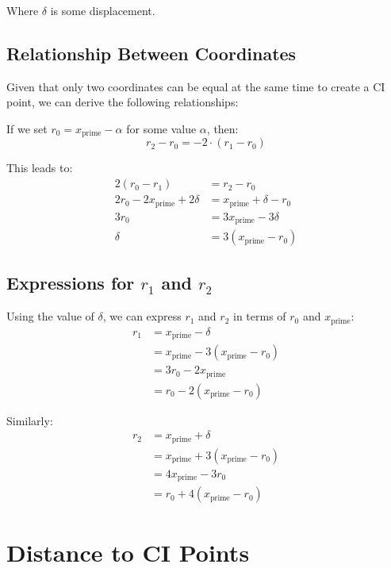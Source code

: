 \documentclass{article}
\begin{document}
Where $\delta$ is some displacement.

\subsection{Relationship Between Coordinates}

Given that only two coordinates can be equal at the same time to create a CI point, we can derive the following relationships:

If we set $r_0 = x_{\text{prime}} - \alpha$ for some value $\alpha$, then:
\begin{equation}
r_2 - r_0 = -2 \cdot (r_1 - r_0)
\end{equation}

This leads to:
\begin{align}
2(r_0 - r_1) &= r_2 - r_0 \\
2r_0 - 2x_{\text{prime}} + 2\delta &= x_{\text{prime}} + \delta - r_0 \\
3r_0 &= 3x_{\text{prime}} - 3\delta \\
\delta &= 3(x_{\text{prime}} - r_0)
\end{align}

\subsection{Expressions for $r_1$ and $r_2$}

Using the value of $\delta$, we can express $r_1$ and $r_2$ in terms of $r_0$ and $x_{\text{prime}}$:
\begin{align}
r_1 &= x_{\text{prime}} - \delta \\
&= x_{\text{prime}} - 3(x_{\text{prime}} - r_0) \\
&= 3r_0 - 2x_{\text{prime}} \\
&= r_0 - 2(x_{\text{prime}} - r_0)
\end{align}

Similarly:
\begin{align}
r_2 &= x_{\text{prime}} + \delta \\
&= x_{\text{prime}} + 3(x_{\text{prime}} - r_0) \\
&= 4x_{\text{prime}} - 3r_0 \\
&= r_0 + 4(x_{\text{prime}} - r_0)
\end{align}

\section{Distance to CI Points}
\end{document}

